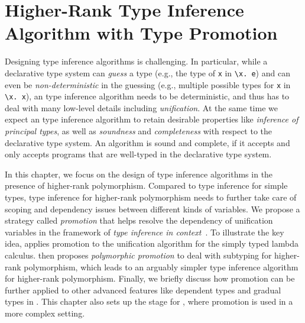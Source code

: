 \chapter{Higher-Rank Type Inference Algorithm with Type Promotion}
\label{chap:Promotion}

Designing type inference algorithms is challenging. In particular, while a
declarative type system can \textit{guess} a type (e.g., the type of
\lstinline{x} in \lstinline{\x. e}) and can even be \textit{non-deterministic}
in the guessing (e.g., multiple possible types for \lstinline{x} in
\lstinline{\x. x}), an type inference algorithm needs to be deterministic, and
thus has to deal with many low-level details including \textit{unification}. At the
same time we expect an type inference algorithm to retain desirable properties
like \textit{inference of principal types}, as well as \textit{soundness} and
\textit{completeness} with respect to the declarative type system. An algorithm
is sound and complete, if it accepts and only accepts programs that are
well-typed in the declarative type system.

In this chapter, we focus on the design of type inference algorithms in the
presence of higher-rank polymorphism. Compared to type inference for simple
types, type inference for higher-rank polymorphism needs to further take care of
scoping and dependency issues between different kinds of variables. We propose a
strategy called \textit{promotion} that helps resolve the dependency of
unification variables in the framework of \textit{type inference in
  context}~\citep{gundry2010type}. To illustrate the key idea,
 applies promotion to the unification algorithm for the simply
typed lambda calculus.  then proposes \textit{polymorphic
  promotion} to deal with subtyping for higher-rank polymorphism, which leads to
an arguably simpler type inference algorithm for higher-rank polymorphism.
Finally, we briefly discuss how promotion can be further applied to other
advanced features like dependent types and gradual types in
. This chapter also sets up the stage for
, where promotion is used in a more complex setting.







